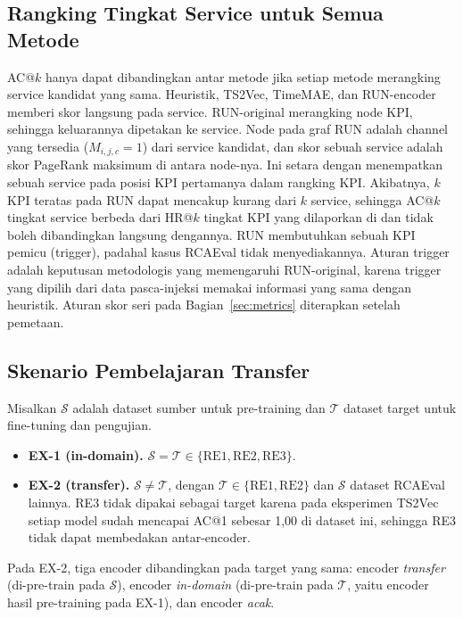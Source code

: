 \subsection{Rangking Tingkat Service untuk Semua Metode}\label{sec:runmap}
AC@$k$ hanya dapat dibandingkan antar metode jika setiap metode merangking service kandidat yang sama. Heuristik, TS2Vec, TimeMAE, dan RUN-encoder memberi skor langsung pada service. RUN-original merangking node KPI, sehingga keluarannya dipetakan ke service. Node pada graf RUN adalah channel yang tersedia ($M_{i,j,c}=1$) dari service kandidat, dan skor sebuah service adalah skor PageRank maksimum di antara node-nya. Ini setara dengan menempatkan sebuah service pada posisi KPI pertamanya dalam rangking KPI. Akibatnya, $k$ KPI teratas pada RUN dapat mencakup kurang dari $k$ service, sehingga AC@$k$ tingkat service berbeda dari HR@$k$ tingkat KPI yang dilaporkan di \cite{lin2024run} dan tidak boleh dibandingkan langsung dengannya.  RUN membutuhkan sebuah KPI pemicu (trigger), padahal kasus RCAEval tidak menyediakannya. Aturan trigger adalah keputusan metodologis yang memengaruhi RUN-original, karena trigger yang dipilih dari data pasca-injeksi memakai informasi yang sama dengan heuristik.  Aturan skor seri pada Bagian~\ref{sec:metrics} diterapkan setelah pemetaan.

\subsection{Skenario Pembelajaran Transfer}
Misalkan $\mathcal{S}$ adalah dataset sumber untuk pre-training dan $\mathcal{T}$ dataset target untuk fine-tuning dan pengujian.
\begin{itemize}
\item \textbf{EX-1 (in-domain).} $\mathcal{S}=\mathcal{T}\in\{\mathrm{RE1},\mathrm{RE2},\mathrm{RE3}\}$.
\item \textbf{EX-2 (transfer).} $\mathcal{S}\neq\mathcal{T}$, dengan $\mathcal{T}\in\{\mathrm{RE1},\mathrm{RE2}\}$ dan $\mathcal{S}$ dataset RCAEval lainnya. RE3 tidak dipakai sebagai target karena pada eksperimen TS2Vec setiap model sudah mencapai AC@1 sebesar 1,00 di dataset ini, sehingga RE3 tidak dapat membedakan antar-encoder.
\end{itemize}
Pada EX-2, tiga encoder dibandingkan pada target yang sama: encoder \emph{transfer} (di-pre-train pada $\mathcal{S}$), encoder \emph{in-domain} (di-pre-train pada $\mathcal{T}$, yaitu encoder hasil pre-training pada EX-1), dan encoder \emph{acak}.

